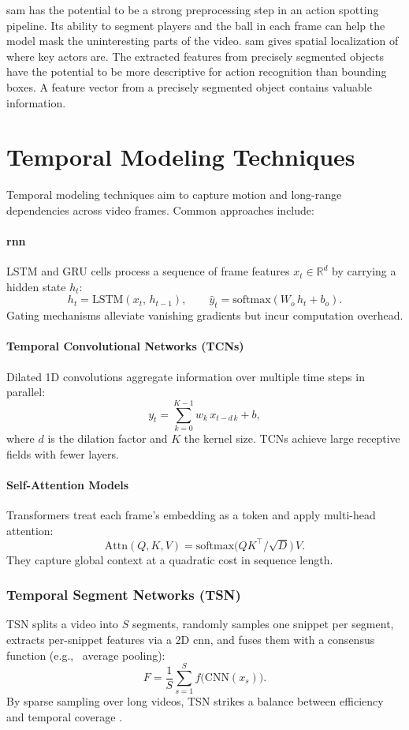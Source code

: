 \acrshort{sam} has the potential to be a strong preprocessing step in an action spotting pipeline. Its ability to segment players and the ball in each frame can help the model mask the uninteresting parts of the video. \acrshort{sam} gives spatial localization of where key actors are. The extracted features from precisely segmented objects have the potential to be more descriptive for action recognition than bounding boxes. A feature vector from a precisely segmented object contains valuable information. 




\section{Temporal Modeling Techniques}
\label{sec:temporal_models}

Temporal modeling techniques aim to capture motion and long-range dependencies across video frames. Common approaches include: 

\paragraph{\acrfull{rnn}}  
LSTM and GRU cells process a sequence of frame features \(x_t\in\mathbb{R}^d\) by carrying a hidden state \(h_t\):
\[
h_t = \mathrm{LSTM}(x_t,\,h_{t-1}), 
\qquad
\hat y_t = \mathrm{softmax}(W_o\,h_t + b_o).
\]
Gating mechanisms alleviate vanishing gradients but incur computation overhead.

\paragraph{Temporal Convolutional Networks (TCNs)}  
Dilated 1D convolutions aggregate information over multiple time steps in parallel:
\[
y_t = \sum_{k=0}^{K-1} w_k\,x_{t - d\,k} + b,
\]
where \(d\) is the dilation factor and \(K\) the kernel size. TCNs achieve large receptive fields with fewer layers.

\paragraph{Self-Attention Models}  
Transformers treat each frame's embedding as a token and apply multi-head attention:
\[
\mathrm{Attn}(Q,K,V) = \mathrm{softmax}\bigl(QK^\top/\sqrt{D}\bigr)\,V.
\]
They capture global context at a quadratic cost in sequence length.

\subsubsection{Temporal Segment Networks (TSN)}  
TSN splits a video into \(S\) segments, randomly samples one snippet per segment, extracts per-snippet features via a 2D \acrshort{cnn}, and fuses them with a consensus function (e.g., \ average pooling):
\[
F = \frac{1}{S}\sum_{s=1}^{S}f\bigl(\mathrm{CNN}(x_s)\bigr).
\]
By sparse sampling over long videos, TSN strikes a balance between efficiency and temporal coverage \cite{wang_tsn_2017}.

